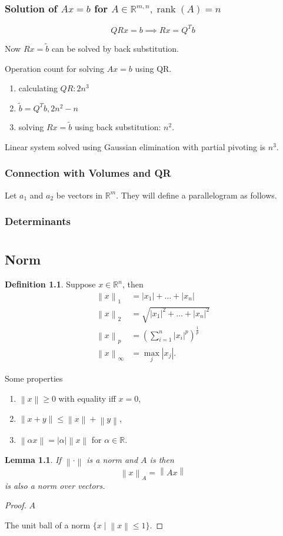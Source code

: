 \documentclass{report}
\newcommand{\R}{\mathbb{R}}
\def \rank {\operatorname{rank}}
\newcommand{\norm}[1]{\left\| #1 \right\|}
\newtheorem{lemma}{Lemma}[section]
\theoremstyle{definition}
\newtheorem{definition}{Definition}[section]
\theoremstyle{remark}
\numberwithin{equation}{section}
\begin{document}
\subsection{Solution of $Ax = b$ for $A \in \R^{m, n}, \rank(A) = n$}
\[QRx = b \implies Rx = Q^Tb\]

Now $Rx = \tilde{b}$ can be solved by back substitution.

Operation count for solving $Ax = b$ using QR.
\begin{enumerate}
    \item calculating $QR: 2n^3$
    \item $\tilde{b} = Q^Tb, 2n^2 - n$
    \item solving $Rx = \tilde{b}$ using back substitution: $n^2$.
\end{enumerate}
Linear system solved using Gaussian elimination with partial pivoting is $n^3$.

\subsection{Connection with Volumes and QR}
Let $a_1$ and $a_2$ be vectors in $\R^m$. They will define a parallelogram as follows.

\subsection{Determinants}


\chapter{}

\section{Norm}
\begin{definition}
    Suppose $x \in \R^n$, then \begin{align*}
        \norm{x}_1 & = |x_1| + \ldots + |x_n| \\
        \norm{x}_2 & = \sqrt{|x_1|^2 + \ldots + |x_n|^2} \\
        \norm{x}_p & = \left(\sum_{i=1}^n |x_i|^p\right)^{\frac{1}{p}} \\
        \norm{x}_\infty & = \max_j |x_j|.
    \end{align*}
\end{definition}
Some properties \begin{enumerate}
    \item $\norm{x} \geq 0$ with equality iff $x = 0$,
    \item $\norm{x + y} \leq \norm{x} + \norm{y}$,
    \item $\norm{\alpha x} = |\alpha| \norm{x}$ for $\alpha \in \R$.
\end{enumerate}

\begin{lemma}
    If $\norm{\cdot}$ is a norm and $A$ is then \[
        \norm{x}_A = \norm{Ax}    
    \] is also a norm over vectors.
\end{lemma}
\begin{proof}
    $A$

    The unit ball of a norm $\{x \mid \norm{x} \leq 1\}$.
\end{proof}
\end{document}
